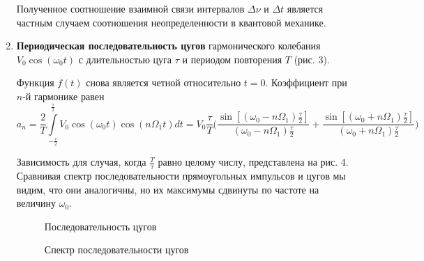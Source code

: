 \documentclass[a4paper,12pt]{article} %
\begin{document}
\begin{enumerate}
	Полученное соотношение взаимной связи интервалов $\Delta \nu$ и $\Delta t$ является
	частным случаем соотношения неопределенности в квантовой механике.
	
	\item \textbf{Периодическая последовательность цугов} гармонического колебания $V_{0}\cos(\omega_{0}t)$ с длительностью цуга $\tau$ и периодом повторения $T$ (рис. 3).
	
	Функция $f(t)$ снова является четной относительно $t=0$. Коэффициент при $n$-й гармонике равен
\begin{equation}
    a_{n}=\dfrac{2}{T}\int\limits_{-\frac{\tau}{2}}^{\frac{\tau}{2}}V_{0}\cos(\omega_{0}t)\cos(n \Omega_{1} t)dt=V_{0}\dfrac{\tau}{T} \bigg(\dfrac{\sin[(\omega_{0}-n\Omega_{1})\frac{\tau}{2}]}{(\omega_{0}-n\Omega_{1})\frac{\tau}{2}}+\dfrac{\sin[(\omega_{0}+n\Omega_{1})\frac{\tau}{2}]}{(\omega_{0}+n\Omega_{1})\frac{\tau}{2}} \bigg)
\label{eq6}
\end{equation}
	
	Зависимость для случая, когда $\frac{T}{\tau}$ равно целому числу, представлена на рис. 4. Сравнивая спектр последовательности прямоугольных импульсов и цугов мы видим, что они аналогичны, но их максимумы сдвинуты по частоте на величину $\omega_{0}$.
	
	\begin{figure}[h]
		\begin{minipage}[h]{0.5\linewidth}
			\caption{Последовательность цугов}
		\end{minipage}
		\begin{minipage}[h]{0.5\linewidth}
			\caption{Спектр последовательности цугов}
		\end{minipage}
	\end{figure}


\end{enumerate}
\end{document}
